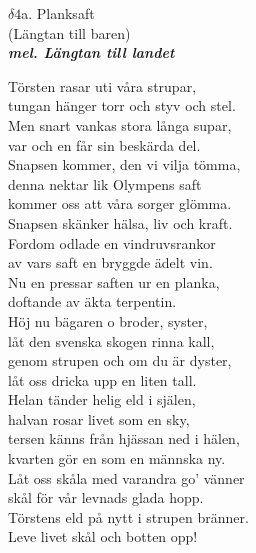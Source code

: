 \documentclass[a6paper,10pt]{article}
\newcommand{\mel}[1]{\small\textbf{\textit{mel. #1 \\}}}
\begin{document}
\setlength{\oddsidemargin}{-0.47in}
\noindent
\begin{center}
\Large $\delta4$a. Planksaft \\(Längtan till baren) \\ 
\mel{Längtan till landet}
\end{center}
Törsten rasar uti våra strupar, \\
tungan hänger torr och styv och stel. \\
Men snart vankas stora långa supar, \\
var och en får sin beskärda del. \\
Snapsen kommer, den vi vilja tömma, \\
denna nektar lik Olympens saft \\
kommer oss att våra sorger glömma. \\
Snapsen skänker hälsa, liv och kraft. 
\vspace{5pt}\\
Fordom odlade en vindruvsrankor \\
av vars saft en bryggde ädelt vin. \\
Nu en pressar saften ur en planka, \\
doftande av äkta terpentin. \\
Höj nu bägaren o broder, syster, \\
låt den svenska skogen rinna kall, \\
genom strupen och om du är dyster, \\
låt oss dricka upp en liten tall. 
\vspace{5pt}\\
Helan tänder helig eld i själen, \\
halvan rosar livet som en sky, \\
tersen känns från hjässan ned i hälen, \\
kvarten gör en som en männska ny. \\
Låt oss skåla med varandra go' vänner \\
skål för vår levnads glada hopp. \\
Törstens eld på nytt i strupen bränner. \\
Leve livet skål och botten opp! 
\end{document}
